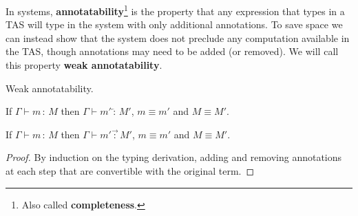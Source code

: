 In \bidir{} systems, \textbf{annotatability}\footnote{
  Also called \textbf{completeness}.
} is the property that any expression that types in a \ac{TAS} will type in the \bidir{} system with only additional annotations. 
To save space we can instead show that the \bidir{} system does not preclude any computation available in the \ac{TAS}, though annotations may need to be added (or removed).%
We will call this property \textbf{weak annotatability}.
\begin{thm} Weak annotatability.
 
If $\Gamma\vdash m\,:\,M$ then $\Gamma\vdash m'\overleftarrow{\,:\,}M'$, $m\equiv m'$ and $M\equiv M'$.
 
If $\Gamma\vdash m\,:\,M$ then $\Gamma\vdash m'\overrightarrow{\,:\,}M'$, $m\equiv m'$ and $M\equiv M'$.
\end{thm}
 
\begin{proof}
By induction on the typing derivation, adding and removing annotations at each step that are convertible with the original term.
\end{proof}
